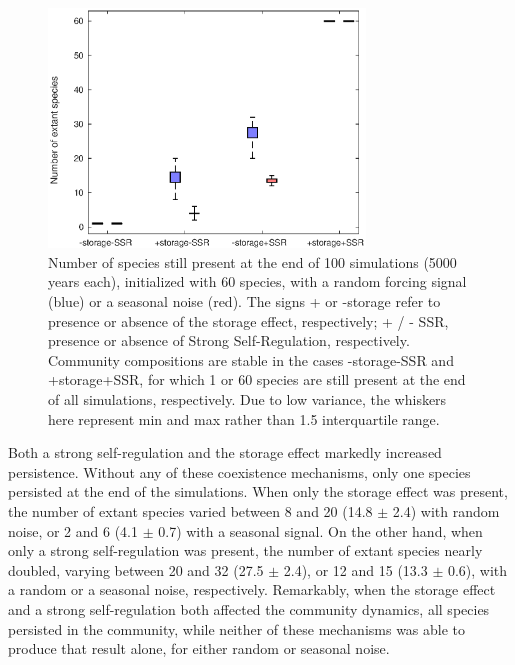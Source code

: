 \documentclass[a4paper,12pt]{article}
\begin{document}
\begin{figure}[!ht]
\begin{centering}
\includegraphics[width=0.75\textwidth]{Fig2}
\par\end{centering}
\caption{Number of species still present at the end of 100 simulations (5000
years each), initialized with 60 species, with a random forcing signal
(blue) or a seasonal noise (red). The signs + or -storage refer to
presence or absence of the storage effect, respectively; + / - SSR,
presence or absence of Strong Self-Regulation, respectively. Community
compositions are stable in the cases -storage-SSR and +storage+SSR,
for which 1 or 60 species are still present at the end of all simulations,
respectively. Due to low variance, the whiskers here represent min
and max rather than 1.5 interquartile range. \label{fig:Persistence-of-species} }
\end{figure}


Both a strong self-regulation and the storage effect markedly increased
persistence. Without any of these coexistence mechanisms, only one
species persisted at the end of the simulations. When only the storage
effect was present, the number of extant species varied between 8
and 20 (14.8 $\pm$ 2.4) with random noise, or 2 and 6 (4.1 $\pm$
0.7) with a seasonal signal. On the other hand, when only a strong
self-regulation was present, the number of extant species nearly doubled,
varying between 20 and 32 (27.5 $\pm$ 2.4), or 12 and 15 (13.3 $\pm$
0.6), with a random or a seasonal noise, respectively. Remarkably,
when the storage effect and a strong self-regulation both affected
the community dynamics, all species persisted in the community, while
neither of these mechanisms was able to produce that result alone,
for either random or seasonal noise.
\end{document}
